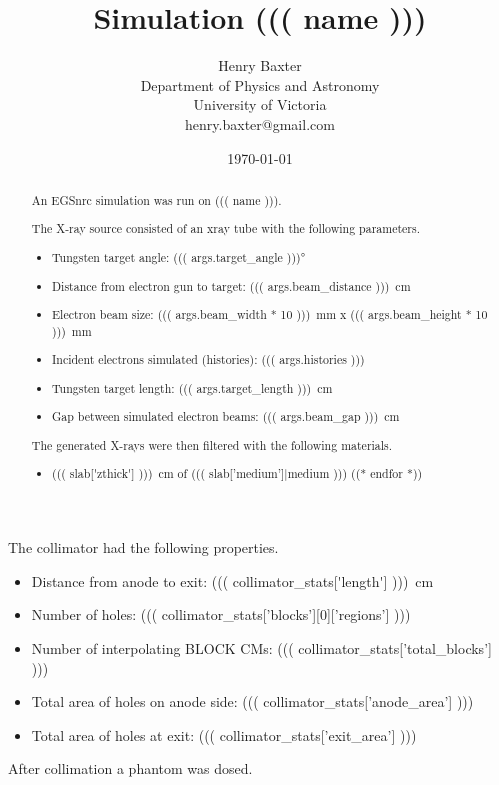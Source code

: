 \documentclass[12pt]{article}
\title{Simulation ((( name )))}
\author{
        Henry Baxter \\
                Department of Physics and Astronomy\\
        University of Victoria\\
        henry.baxter@gmail.com
}
\date{\today}
\begin{document}
\maketitle

\begin{abstract}
An EGSnrc simulation was run on ((( name ))).

The X-ray source consisted of an xray tube with the following parameters.
\begin{itemize}
	\item Tungsten target angle: \ang{((( args.target_angle )))}
	\item Distance from electron gun to target: \SI{((( args.beam_distance )))}{\cm}
	\item Electron beam size: \SI{((( args.beam_width * 10 )))}{\mm} x \SI{((( args.beam_height * 10 )))}{\mm}
	\item Incident electrons simulated (histories): ((( args.histories )))
	\item Tungsten target length: \SI{((( args.target_length )))}{\cm}
	\item Gap between simulated electron beams: \SI{((( args.beam_gap )))}{\cm}
\end{itemize}

The generated X-rays were then filtered with the following materials.
\begin{itemize}
	((* for slab in filter['cms']['slabs'] *))
	\item \SI{((( slab['zthick'] )))}{\cm} of ((( slab['medium']|medium )))
	((* endfor *))
\end{itemize}
\end{abstract}

The collimator had the following properties.
\begin{itemize}
	\item Distance from anode to exit: \SI{((( collimator_stats['length'] )))}{\cm}
	\item Number of holes: ((( collimator_stats['blocks'][0]['regions'] )))
	\item Number of interpolating BLOCK CMs: ((( collimator_stats['total_blocks'] )))
	\item Total area of holes on anode side: ((( collimator_stats['anode_area'] )))
	\item Total area of holes at exit: ((( collimator_stats['exit_area'] )))
\end{itemize}

After collimation a phantom was dosed.
\end{document}
